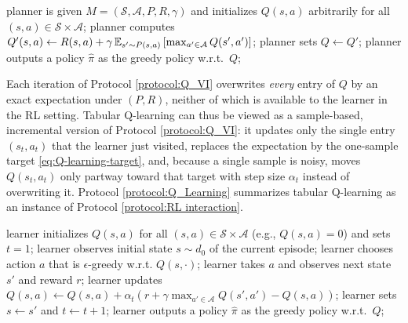 \begin{protocol}[htb]
\caption{Q-value iteration (planning)} \label{protocol:Q_VI}
\begin{algorithmic}[1]
\State planner is given $M=(\mathcal{S},\mathcal{A},P,R,\gamma)$ and initializes $Q(s,a)$ arbitrarily for all $(s,a)\in\mathcal{S}\times\mathcal{A}$;
     
        \State planner computes $Q'(s,a) \gets R(s,a)+\gamma\operatorname{\mathbb{E}}_{s'\sim P(s,a)}\left[\max_{a'\in\mathcal{A}}Q(s',a')\right]$;
    \EndFor
    \State planner sets $Q \gets Q'$;
\State planner outputs a policy $\widehat{\pi}$ as the greedy policy w.r.t.~$Q$;
\end{algorithmic}
\end{protocol}

Each iteration of Protocol \ref{protocol:Q_VI} overwrites {\em every} entry of $Q$ by an exact expectation under $(P,R)$, neither of which is available to the learner in the RL setting.
Tabular Q-learning can thus be viewed as a sample-based, incremental version of Protocol \ref{protocol:Q_VI}: it updates only the single entry $(s_t,a_t)$ that the learner just visited, replaces the expectation by the one-sample target \eqref{eq:Q-learning-target}, and, because a single sample is noisy, moves $Q(s_t,a_t)$ only partway toward that target with step size $\alpha_t$ instead of overwriting it.
Protocol \ref{protocol:Q_Learning} summarizes tabular Q-learning as an instance of Protocol \ref{protocol:RL interaction}.
\begin{protocol}[htb]
\caption{Tabular Q-learning algorithm} \label{protocol:Q_Learning}
\begin{algorithmic}[1]
\State learner initializes $Q(s,a)$ for all $(s,a)\in\mathcal{S}\times\mathcal{A}$ (e.g., $Q(s,a)=0$) and sets $t=1$;
    \State learner observes initial state $s\sim d_0$ of the current episode; 
        \State learner chooses action $a$ that is $\epsilon$-greedy w.r.t. $Q(s,\cdot)$;
        \State learner takes $a$ and  observes next state $s'$ and reward $r$;
        \State learner updates $Q(s,a) \gets Q(s,a) + \alpha_t\left(r+\gamma\max_{a'\in\mathcal{A}}Q(s',a')-Q(s,a) \right)$;
        \State learner sets $s\gets s'$ and $t\gets t+1$;
    \EndFor
{}
\State learner outputs a policy $\widehat{\pi}$ as the greedy policy w.r.t.~$Q$;
\end{algorithmic}
\end{protocol}

